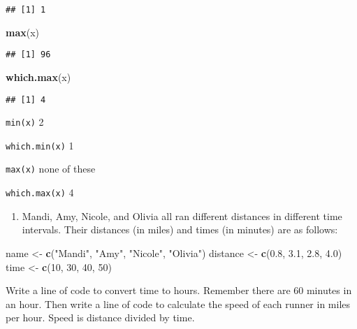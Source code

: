 \documentclass[
]{article}
\newenvironment{Shaded}{\begin{snugshade}}{\end{snugshade}}
\newcommand{\DecValTok}[1]{\textcolor[rgb]{0.00,0.00,0.81}{#1}}
\newcommand{\FloatTok}[1]{\textcolor[rgb]{0.00,0.00,0.81}{#1}}
\newcommand{\KeywordTok}[1]{\textcolor[rgb]{0.13,0.29,0.53}{\textbf{#1}}}
\newcommand{\NormalTok}[1]{#1}
\newcommand{\StringTok}[1]{\textcolor[rgb]{0.31,0.60,0.02}{#1}}
\providecommand{\tightlist}{%
  \setlength{\itemsep}{0pt}\setlength{\parskip}{0pt}}
\begin{document}
\begin{verbatim}
## [1] 1
\end{verbatim}

\begin{Shaded}
\begin{Highlighting}[]
\KeywordTok{max}\NormalTok{(x)}
\end{Highlighting}
\end{Shaded}

\begin{verbatim}
## [1] 96
\end{verbatim}

\begin{Shaded}
\begin{Highlighting}[]
\KeywordTok{which.max}\NormalTok{(x)}
\end{Highlighting}
\end{Shaded}

\begin{verbatim}
## [1] 4
\end{verbatim}

\texttt{min(x)} 2

\texttt{which.min(x)} 1

\texttt{max(x)} none of these

\texttt{which.max(x)} 4

\begin{enumerate}
\def\labelenumi{\arabic{enumi}.}
\setcounter{enumi}{2}
\tightlist
\item
  Mandi, Amy, Nicole, and Olivia all ran different distances in
  different time intervals. Their distances (in miles) and times (in
  minutes) are as follows:
\end{enumerate}

\begin{Shaded}
\begin{Highlighting}[]
\NormalTok{name <-}\StringTok{ }\KeywordTok{c}\NormalTok{(}\StringTok{"Mandi"}\NormalTok{, }\StringTok{"Amy"}\NormalTok{, }\StringTok{"Nicole"}\NormalTok{, }\StringTok{"Olivia"}\NormalTok{)}
\NormalTok{distance <-}\StringTok{ }\KeywordTok{c}\NormalTok{(}\FloatTok{0.8}\NormalTok{, }\FloatTok{3.1}\NormalTok{, }\FloatTok{2.8}\NormalTok{, }\FloatTok{4.0}\NormalTok{)}
\NormalTok{time <-}\StringTok{ }\KeywordTok{c}\NormalTok{(}\DecValTok{10}\NormalTok{, }\DecValTok{30}\NormalTok{, }\DecValTok{40}\NormalTok{, }\DecValTok{50}\NormalTok{)}
\end{Highlighting}
\end{Shaded}

Write a line of code to convert time to hours. Remember there are 60
minutes in an hour. Then write a line of code to calculate the speed of
each runner in miles per hour. Speed is distance divided by time.
\end{document}
